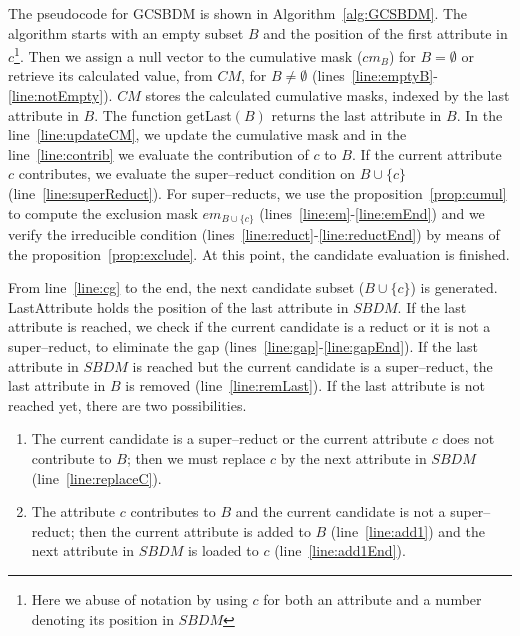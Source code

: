 \documentclass[authoryear,preprint,review,12pt]{elsarticle}
\begin{document}
		The pseudocode for GCSBDM is shown in Algorithm~\ref{alg:GCSBDM}. The algorithm starts with an empty subset $B$ and the position of the first attribute in $c$\footnote{Here we abuse of notation by using $c$ for both an attribute and a number denoting its position in $SBDM$}. Then we assign a null vector to the cumulative mask ($cm_B$) for $B=\emptyset$ or retrieve its calculated value, from $CM$, for $B\neq \emptyset$ (lines~\ref{line:emptyB}-\ref{line:notEmpty}). $CM$ stores the calculated cumulative masks, indexed by the last attribute in $B$. The function getLast$(B)$ returns the last attribute in $B$.
		In the line~\ref{line:updateCM}, we update the cumulative mask and in
		the line~\ref{line:contrib} we evaluate the contribution of $c$ to $B$. If the current attribute $c$ contributes, we evaluate the super--reduct condition on $B\cup \lbrace c\rbrace$ (line~\ref{line:superReduct}). For super--reducts, we use the proposition~\ref{prop:cumul} to compute the exclusion mask $em_{B\cup \lbrace c\rbrace}$ (lines~\ref{line:em}-\ref{line:emEnd}) and we verify the irreducible condition (lines~\ref{line:reduct}-\ref{line:reductEnd}) by means of the proposition~\ref{prop:exclude}. At this point, the candidate evaluation is finished.
		
		From line~\ref{line:cg} to the end, the next candidate subset ($B\cup \lbrace c\rbrace$) is generated. 
		LastAttribute holds the position of the last attribute in $SBDM$. If the last attribute is
		reached, we check if the current candidate is a reduct or it is not a super--reduct, to eliminate the gap
		(lines~\ref{line:gap}-\ref{line:gapEnd}). If the last attribute in $SBDM$ is reached but the current candidate is a super--reduct, the last attribute in $B$ is removed (line~\ref{line:remLast}). If the last attribute is 
		not reached yet, there are two possibilities. 
		\begin{enumerate}
			\item The current candidate is a super--reduct or the current attribute $c$ does not contribute to $B$; then we must replace $c$ by the next attribute in $SBDM$ (line~\ref{line:replaceC}).
			\item The attribute $c$ contributes to $B$ and the current candidate is not a super--reduct; then the current attribute is added to $B$ (line~\ref{line:add1}) and the next attribute in $SBDM$ is loaded to $c$ (line~\ref{line:add1End}).
		\end{enumerate}  
	
\end{document}
